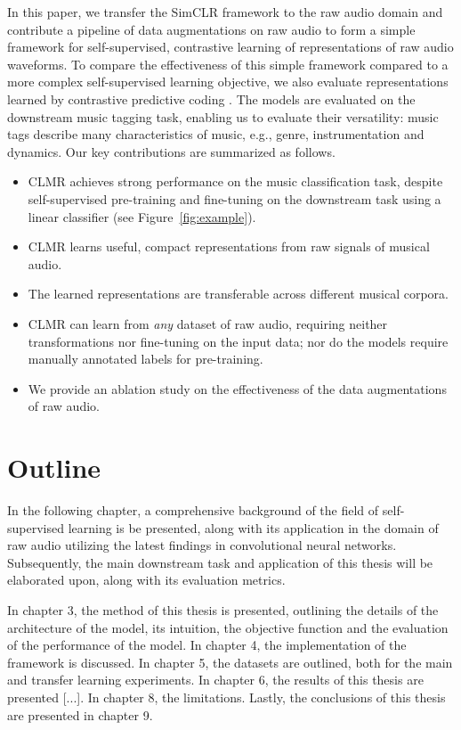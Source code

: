 In this paper, we transfer the SimCLR framework \cite{chen_simple_2020} to the raw audio domain and contribute a pipeline of data augmentations on raw audio to form a simple framework for self-supervised, contrastive  learning of representations of raw audio waveforms. To compare the effectiveness of this simple framework compared to a more complex self-supervised learning objective, we also evaluate representations learned by contrastive predictive coding \cite{oord_representation_2019}. The models are evaluated on the downstream music tagging task, enabling us to evaluate their versatility: music tags describe many characteristics of music, e.g., genre, instrumentation and dynamics. Our key contributions are summarized as follows.
\begin{itemize}
    \item CLMR achieves strong performance on the music classification task, despite self-supervised pre-training and fine-tuning on the downstream task using a linear classifier (see Figure~\ref{fig:example}).
    \item CLMR learns useful, compact representations from raw signals of musical audio.
    \item The learned representations are transferable across different musical corpora.
    \item CLMR can learn from \emph{any} dataset of raw audio, requiring neither transformations nor fine-tuning on the input data; nor do the models require manually annotated labels for pre-training.
    \item We provide an ablation study on the effectiveness of the data augmentations of raw audio.
\end{itemize}


\section{Outline}
In the following chapter, a comprehensive background of the field of self-supervised learning is be presented, along with its application in the domain of raw audio utilizing the latest findings in convolutional neural networks. Subsequently, the main downstream task and application of this thesis will be elaborated upon, along with its evaluation metrics.

In chapter 3, the method of this thesis is presented, outlining the details of the architecture of the model, its intuition, the objective function and the evaluation of the performance of the model. In chapter 4, the implementation of the framework is discussed. In chapter 5, the datasets are outlined, both for the main and transfer learning experiments. In chapter 6, the results of this thesis are presented [...]. In chapter 8, the limitations. Lastly, the conclusions of this thesis are presented in chapter 9.

